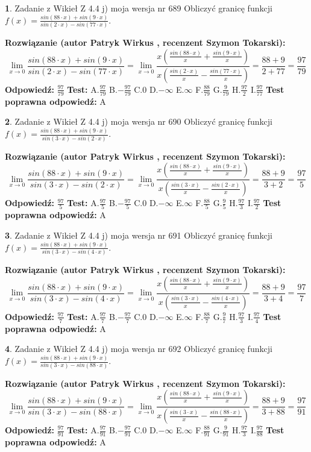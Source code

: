 \documentclass[12pt, a4paper]{article}
\theoremstyle{definition} %
\newtheorem{zad}{}
\newcommand{\zadStart}[1]{\begin{zad}#1\newline}
\newcommand{\zadStop}{\end{zad}}
\newcommand{\rozwStart}[2]{\noindent \textbf{Rozwiązanie (autor #1 , recenzent #2): }\newline}
\newcommand{\rozwStop}{\newline}
\newcommand{\odpStart}{\noindent \textbf{Odpowiedź:}\newline}
\newcommand{\odpStop}{\newline}
\newcommand{\testStart}{\noindent \textbf{Test:}\newline}
\newcommand{\testStop}{\newline}
\newcommand{\kluczStart}{\noindent \textbf{Test poprawna odpowiedź:}\newline}
\newcommand{\kluczStop}{\newline}
\begin{document}
\zadStart{Zadanie z Wikieł Z 4.4 j) moja wersja nr 689}
Obliczyć granicę funkcji $f(x)=\frac{sin(88\cdot x) +sin(9\cdot x)}{sin(2\cdot x) -sin(77\cdot x)}$.
\zadStop
\rozwStart{Patryk Wirkus}{Szymon Tokarski}
$$\lim\limits_{x\to 0}\frac{sin(88\cdot x) +sin(9\cdot x)}{sin(2\cdot x) -sin(77\cdot x)}=\lim\limits_{x\to 0}\frac{x(\frac{sin(88\cdot x)}{x}+\frac{sin(9\cdot x)}{x})}{x(\frac{sin(2\cdot x)}{x}-\frac{sin(77\cdot x)}{x})}=\frac{88+9}{2+77} = \frac{97}{79}$$
\rozwStop
\odpStart
$\frac{97}{79}$
\odpStop
\testStart
A.$\frac{97}{79}$
B.$-\frac{97}{79}$
C.$0$
D.$-\infty$
E.$\infty$
F.$\frac{88}{79}$
G.$\frac{9}{79}$
H.$\frac{97}{2}$
I.$\frac{97}{77}$
\testStop
\kluczStart
A
\kluczStop



\zadStart{Zadanie z Wikieł Z 4.4 j) moja wersja nr 690}
Obliczyć granicę funkcji $f(x)=\frac{sin(88\cdot x) +sin(9\cdot x)}{sin(3\cdot x) -sin(2\cdot x)}$.
\zadStop
\rozwStart{Patryk Wirkus}{Szymon Tokarski}
$$\lim\limits_{x\to 0}\frac{sin(88\cdot x) +sin(9\cdot x)}{sin(3\cdot x) -sin(2\cdot x)}=\lim\limits_{x\to 0}\frac{x(\frac{sin(88\cdot x)}{x}+\frac{sin(9\cdot x)}{x})}{x(\frac{sin(3\cdot x)}{x}-\frac{sin(2\cdot x)}{x})}=\frac{88+9}{3+2} = \frac{97}{5}$$
\rozwStop
\odpStart
$\frac{97}{5}$
\odpStop
\testStart
A.$\frac{97}{5}$
B.$-\frac{97}{5}$
C.$0$
D.$-\infty$
E.$\infty$
F.$\frac{88}{5}$
G.$\frac{9}{5}$
H.$\frac{97}{3}$
I.$\frac{97}{2}$
\testStop
\kluczStart
A
\kluczStop



\zadStart{Zadanie z Wikieł Z 4.4 j) moja wersja nr 691}
Obliczyć granicę funkcji $f(x)=\frac{sin(88\cdot x) +sin(9\cdot x)}{sin(3\cdot x) -sin(4\cdot x)}$.
\zadStop
\rozwStart{Patryk Wirkus}{Szymon Tokarski}
$$\lim\limits_{x\to 0}\frac{sin(88\cdot x) +sin(9\cdot x)}{sin(3\cdot x) -sin(4\cdot x)}=\lim\limits_{x\to 0}\frac{x(\frac{sin(88\cdot x)}{x}+\frac{sin(9\cdot x)}{x})}{x(\frac{sin(3\cdot x)}{x}-\frac{sin(4\cdot x)}{x})}=\frac{88+9}{3+4} = \frac{97}{7}$$
\rozwStop
\odpStart
$\frac{97}{7}$
\odpStop
\testStart
A.$\frac{97}{7}$
B.$-\frac{97}{7}$
C.$0$
D.$-\infty$
E.$\infty$
F.$\frac{88}{7}$
G.$\frac{9}{7}$
H.$\frac{97}{3}$
I.$\frac{97}{4}$
\testStop
\kluczStart
A
\kluczStop



\zadStart{Zadanie z Wikieł Z 4.4 j) moja wersja nr 692}
Obliczyć granicę funkcji $f(x)=\frac{sin(88\cdot x) +sin(9\cdot x)}{sin(3\cdot x) -sin(88\cdot x)}$.
\zadStop
\rozwStart{Patryk Wirkus}{Szymon Tokarski}
$$\lim\limits_{x\to 0}\frac{sin(88\cdot x) +sin(9\cdot x)}{sin(3\cdot x) -sin(88\cdot x)}=\lim\limits_{x\to 0}\frac{x(\frac{sin(88\cdot x)}{x}+\frac{sin(9\cdot x)}{x})}{x(\frac{sin(3\cdot x)}{x}-\frac{sin(88\cdot x)}{x})}=\frac{88+9}{3+88} = \frac{97}{91}$$
\rozwStop
\odpStart
$\frac{97}{91}$
\odpStop
\testStart
A.$\frac{97}{91}$
B.$-\frac{97}{91}$
C.$0$
D.$-\infty$
E.$\infty$
F.$\frac{88}{91}$
G.$\frac{9}{91}$
H.$\frac{97}{3}$
I.$\frac{97}{88}$
\testStop
\kluczStart
A
\kluczStop
\end{document}
